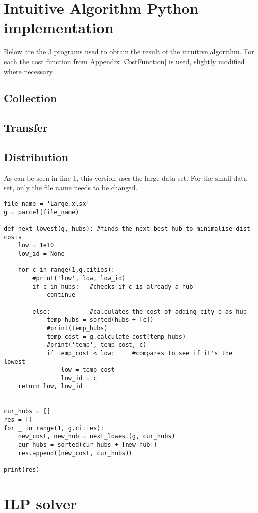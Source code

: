 \documentclass{article}
\begin{document}
\begin{verbatim}
\end{verbatim}

\section{Intuitive Algorithm Python implementation}
Below are the 3 programs used to obtain the result of the intuitive algorithm. For each the cost function from Appendix \ref{CostFunction} is used, slightly modified where necessary.

\subsection{Collection}
\subsection{Transfer}
\subsection{Distribution}
As can be seen in line 1, this version uses the large data set. For the small data set, only the file name needs to be changed.
\begin{verbatim}
file_name = 'Large.xlsx'
g = parcel(file_name)

def next_lowest(g, hubs): #finds the next best hub to minimalise dist costs
    low = 1e10
    low_id = None
    
    for c in range(1,g.cities):
        #print('low', low, low_id)
        if c in hubs:   #checks if c is already a hub
            continue
        
        else:           #calculates the cost of adding city c as hub
            temp_hubs = sorted(hubs + [c])
            #print(temp_hubs)
            temp_cost = g.calculate_cost(temp_hubs)
            #print('temp', temp_cost, c)
            if temp_cost < low:     #compares to see if it's the lowest
                low = temp_cost
                low_id = c
    return low, low_id


cur_hubs = []
res = []
for _ in range(1, g.cities):
    new_cost, new_hub = next_lowest(g, cur_hubs)
    cur_hubs = sorted(cur_hubs + [new_hub])
    res.append((new_cost, cur_hubs))

print(res)
\end{verbatim}
\newpage

\section{ILP solver}
\label{ILPDef}
\end{document}
